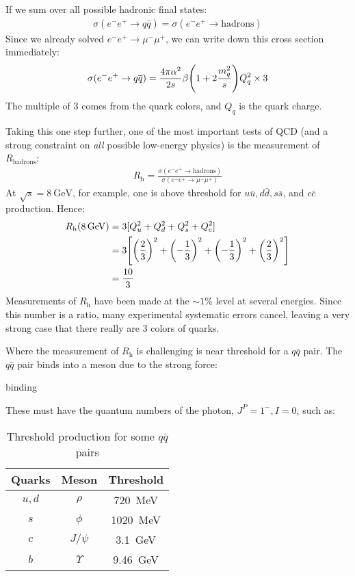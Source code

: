 If we sum over all possible hadronic final states:
\begin{align*}
  \sigma(e^-e^+\to q\bar{q})=\sigma(e^-e^+\to\text{hadrons})
\end{align*}
Since we already solved $e^-e^+\to\mu^-\mu^+$, we can write down this cross section immediately:
\begin{align*}
  \sigma(e^-e^+\to q\overline{q})=\frac{4\pi\alpha^2}{2s}\beta\qty(1+2\frac{m_q^2}{s})
  Q_q^2\times 3
\end{align*}
The multiple of 3 comes from the quark colors, and $Q_q$ is the quark charge.

Taking this one step further, one of the most important tests of QCD (and a strong constraint on \emph{all} possible low-energy physics) is the measurement of $R_{\text{hadrons}}$:
\begin{align*}
  R_{\text{h}}=\frac{\sigma(e^-e^+\to\text{hadrons})}{\sigma(e^-e^+\to\mu^-\mu^+)}
\end{align*}
At $\sqrt{s}=\SI{8}{\GeV}$, for example, one is above threshold for $u\bar{u}, d\bar{d},s\bar{s}$, and $c\bar{c}$ production. Hence:
\begin{align*}
  R_{\text{h}}(\SI{8}{\GeV})&=3[Q_u^2+Q_d^2+Q_s^2+Q_c^2]\\
  &=3\qty[{\qty(\frac23)}^2+{\qty(-\frac13)}^2
  +{\qty(-\frac13)}^2+{\qty(\frac23)}^2]\\
  &=\frac{10}{3}
\end{align*}
Measurements of $R_{\text{h}}$ have been made at the $\sim1\%$ level at several energies. Since this number is a ratio, many experimental systematic errors cancel, leaving a very strong case that there really are 3 colors of quarks.

Where the measurement of $R_{\text{h}}$ is challenging is near threshold for a $q\bar{q}$ pair. The $q\bar{q}$ pair binds into a meson due to the strong force:
\begin{TODO}
  binding
\end{TODO}
These must have the quantum numbers of the photon, $J^P=1^-,I=0$, such as:
\begin{table}[H]
  \centering
  \begin{tabular}{ccc}
    Quarks & Meson      & Threshold \\ \midrule
    $u,d$  & $\rho$     & \SI{720}{\MeV} \\ \midrule
    $s$    & $\phi$     & \SI{1020}{\MeV} \\ \midrule
    $c$    & $J/\psi$   & \SI{3.1}{\GeV} \\ \midrule
    $b$    & $\Upsilon$ & \SI{9.46}{\GeV}
  \end{tabular}
  \caption{Threshold production for some $q\bar{q}$ pairs}
\end{table}

